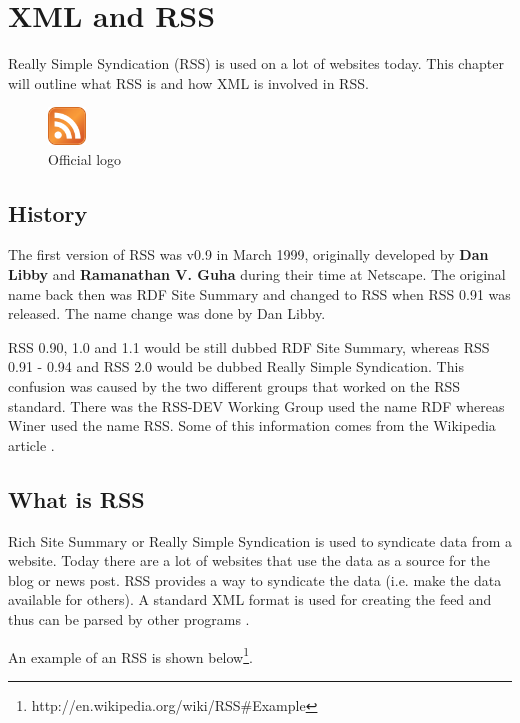 \chapter{XML and RSS}
\label{chap:XML and RSS}
Really Simple Syndication (RSS) is used on a lot of websites today. This chapter will outline what RSS is and how XML is involved in RSS.

\begin{figure}[ht]
\begin{center}
\includegraphics[width=1cm]{Chapters/01_rss_icon.png}
\caption{Official logo\footnotemark}
\end{center}
\end{figure}


\section{History}
The first version of RSS was v0.9 in March 1999, originally developed by \textbf{Dan Libby} and \textbf{Ramanathan V. Guha} during their time at Netscape. The original name back then was RDF Site Summary and changed to RSS when RSS 0.91 was released. The name change was done by Dan Libby.

RSS 0.90, 1.0 and 1.1 would be still dubbed RDF Site Summary, whereas RSS 0.91 - 0.94 and RSS 2.0 would be dubbed Really Simple Syndication. This confusion was caused by the two different groups that worked on the RSS standard. There was the RSS-DEV Working Group used the name RDF whereas Winer used the name RSS. Some of this information comes from the Wikipedia article \cite{rss-wiki}.

\section{What is RSS}
\label{sec:what-is-rss}
Rich Site Summary or Really Simple Syndication is used to syndicate data from a website. Today there are a lot of websites that use the data as a source for the blog or news post. RSS provides a way to syndicate the data (i.e. make the data available for others). A standard XML format is used for creating the feed and thus can be parsed by other programs \cite{web-content-syndication}.

An example of an RSS is shown below\footnote{http://en.wikipedia.org/wiki/RSS\#Example}.

